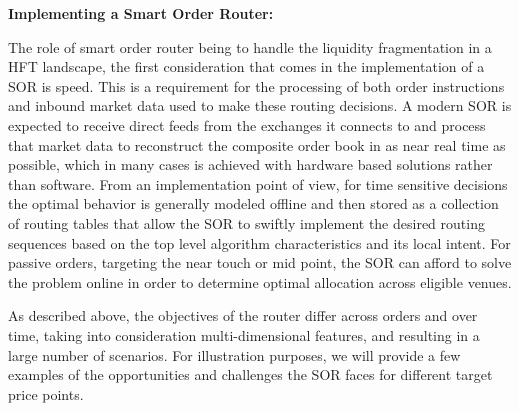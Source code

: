 \noindent\textbf{Implementing a Smart Order Router:} \twomedskip


The role of smart order router being to handle the liquidity fragmentation in a HFT landscape, the first consideration that comes in the implementation of a SOR is speed. This is a requirement for the processing of both order instructions and inbound market data used to make these routing decisions. A modern SOR is expected to receive direct feeds from the exchanges it connects to and process that market data to reconstruct the composite order book in as near real time as possible, which in many cases is achieved with hardware based solutions rather than software. From an implementation point of view, for time sensitive decisions the optimal behavior is generally modeled offline and then stored as a collection of routing tables that allow the SOR to swiftly implement the desired routing sequences based on the top level algorithm characteristics and its local intent. For passive orders, targeting the near touch or mid point, the SOR can afford to solve the problem online in order to determine optimal allocation across eligible venues. 


As described above, the objectives of the router differ across orders and over time, taking into consideration multi-dimensional features, and resulting in a large number of scenarios. For illustration purposes, we will provide a few examples of the opportunities and challenges the SOR faces for different target price points. 


